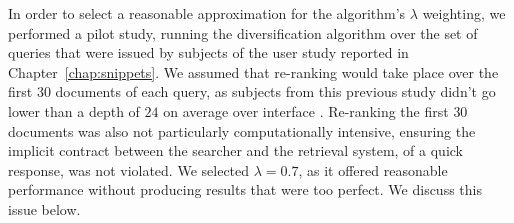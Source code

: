 %
%
%
%
%
%
%
%
%
%
%
%
%
%
%
%
%

In order to select a reasonable approximation for the algorithm's $\lambda$ weighting, we performed a pilot study, running the diversification algorithm over the set of queries that were issued by subjects of the user study reported in Chapter~\ref{chap:snippets}. We assumed that re-ranking would take place over the first $30$ documents of each query, as subjects from this previous study didn't go lower than a depth of $24$ on average over interface . Re-ranking the first $30$ documents was also not particularly computationally intensive, ensuring the implicit contract between the searcher and the retrieval system, of a quick response, was not violated. We selected $\lambda=0.7$, as it offered reasonable performance without producing results that were too perfect. We discuss this issue below.

